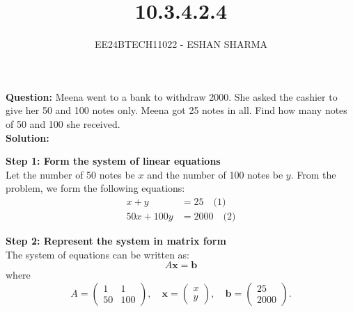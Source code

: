 \documentclass[journal]{IEEEtran}
\begin{document}
	
	
	\vspace{3cm}
	\title{10.3.4.2.4}
	\author{EE24BTECH11022 - ESHAN SHARMA}
	{\let\newpage\relax\maketitle}
	
	\renewcommand{\thefigure}{\theenumi}
	\renewcommand{\thetable}{\theenumi}
	\setlength{\intextsep}{10pt} %
	
	
	\renewcommand{\thetable}{\theenumi}
	
	\textbf{Question:}
	Meena went to a bank to withdraw 2000. She asked the cashier to give her 50 and 100 notes only. Meena got 25 notes in all. Find how many notes of 50 and 100 she received.\\
	
	\textbf{Solution:}
	
	\textbf{Step 1: Form the system of linear equations}\\
	Let the number of 50 notes be \(x\) and the number of 100 notes be \(y\). From the problem, we form the following equations:
	\begin{align}
		x + y &= 25 \quad \text{(1)} \\
		50x + 100y &= 2000 \quad \text{(2)}
	\end{align}
	
	\textbf{Step 2: Represent the system in matrix form}\\
	The system of equations can be written as:
	\[
	A \mathbf{x} = \mathbf{b}
	\]
	where
	\[
	A = \begin{pmatrix} 1 & 1 \\ 50 & 100 \end{pmatrix}, \quad \mathbf{x} = \begin{pmatrix} x \\ y \end{pmatrix}, \quad \mathbf{b} = \begin{pmatrix} 25 \\ 2000 \end{pmatrix}.
	\]
	
\end{document}
